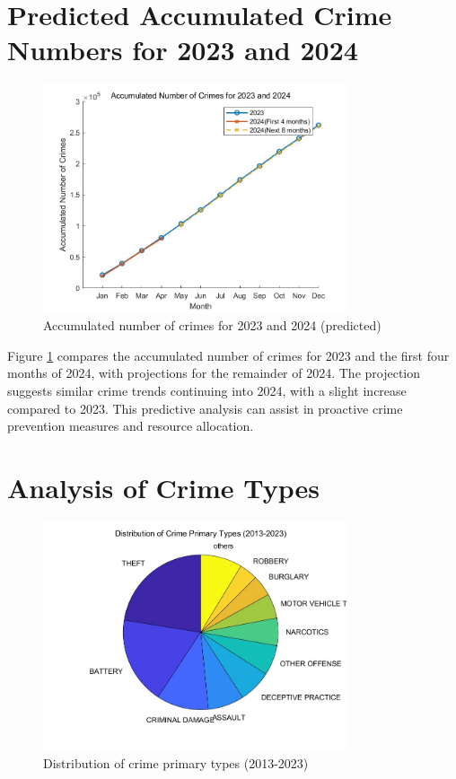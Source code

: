 \documentclass{article}
\begin{document}
\section{Predicted Accumulated Crime Numbers for 2023 and 2024}

\begin{figure}[h!]
    \centering
    \includegraphics[width=0.8\textwidth]{Predicted_accumulated_crimeNumber_line.jpg}
    \caption{Accumulated number of crimes for 2023 and 2024 (predicted)}
    \label{fig:predicted_crimes}
\end{figure}

Figure \ref{fig:predicted_crimes} compares the accumulated number of crimes for 2023 and the first four months of 2024, with projections for the remainder of 2024. The projection suggests similar crime trends continuing into 2024, with a slight increase compared to 2023. This predictive analysis can assist in proactive crime prevention measures and resource allocation.
\FloatBarrier

\section{Analysis of Crime Types}

\begin{figure}[h!]
    \centering
    \includegraphics[width=0.8\textwidth]{Crime_type_pie.jpg}
    \caption{Distribution of crime primary types (2013-2023)}
    \label{fig:crime_types}
\end{figure}
\end{document}
